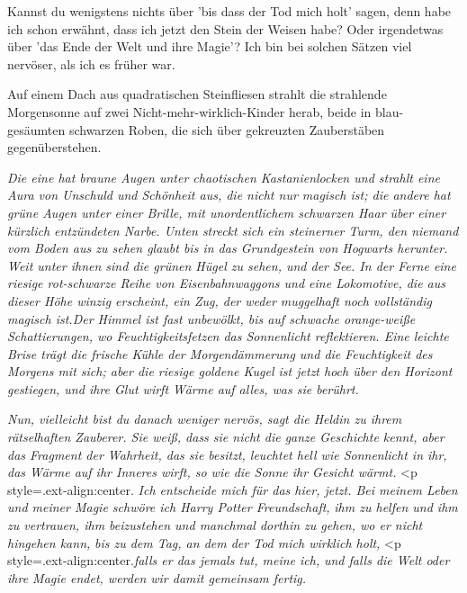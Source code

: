 \glqq{}Kannst du wenigstens nichts über 'bis dass der Tod mich holt' sagen, denn
habe ich schon erwähnt, dass ich jetzt den Stein der Weisen habe? Oder
irgendetwas über 'das Ende der Welt und ihre Magie'? Ich bin bei solchen Sätzen
viel nervöser, als ich es früher war.\grqq{}

Auf einem Dach aus quadratischen Steinfliesen strahlt die strahlende Morgensonne
auf zwei Nicht-mehr-wirklich-Kinder herab, beide in blau-gesäumten schwarzen
Roben, die sich über gekreuzten Zauberstäben gegenüberstehen.

\emph{Die eine hat braune Augen unter chaotischen Kastanienlocken und strahlt
eine Aura von Unschuld und Schönheit aus, die nicht nur magisch ist; die andere
hat grüne Augen unter einer Brille, mit unordentlichem schwarzen Haar über einer
kürzlich entzündeten Narbe. Unten streckt sich ein steinerner Turm, den niemand
vom Boden aus zu sehen glaubt bis in das Grundgestein von Hogwarts herunter.
Weit unter ihnen sind die grünen Hügel zu sehen, und der See. In der Ferne eine
riesige rot-schwarze Reihe von Eisenbahnwaggons und eine Lokomotive, die aus
dieser Höhe winzig erscheint, ein Zug, der weder muggelhaft noch vollständig
magisch ist.Der Himmel ist fast unbewölkt, bis auf schwache orange-weiße
Schattierungen, wo Feuchtigkeitsfetzen das Sonnenlicht reflektieren. Eine
leichte Brise trägt die frische Kühle der Morgendämmerung und die Feuchtigkeit
des Morgens mit sich; aber die riesige goldene Kugel ist jetzt hoch über den
Horizont gestiegen, und ihre Glut wirft Wärme auf alles, was sie berührt.}

\emph{\glqq{}Nun, vielleicht bist du danach weniger nervös\grqq{}, sagt die
Heldin zu ihrem rätselhaften Zauberer. Sie weiß, dass sie nicht die ganze
Geschichte kennt, aber das Fragment der Wahrheit, das sie besitzt, leuchtet hell
wie Sonnenlicht in ihr, das Wärme auf ihr Inneres wirft, so wie die Sonne ihr
Gesicht wärmt.}    <p
style=\grqq{}.ext-align:center\grqq{}.\emph{ \glqq{}Ich entscheide mich für das
hier, jetzt. Bei meinem Leben und meiner Magie schwöre ich Harry Potter
Freundschaft,}    \emph{ihm zu helfen
und ihm zu vertrauen, ihm beizustehen und manchmal dorthin zu gehen, wo er nicht
hingehen kann,}    \emph{bis zu dem
Tag, an dem der Tod mich wirklich holt,}   <p
style=\grqq{}.ext-align:center\grqq{}.\emph{falls er das jemals tut, meine ich,
}   \emph{und falls die Welt oder
ihre Magie endet, werden wir damit gemeinsam fertig.\grqq{}}

